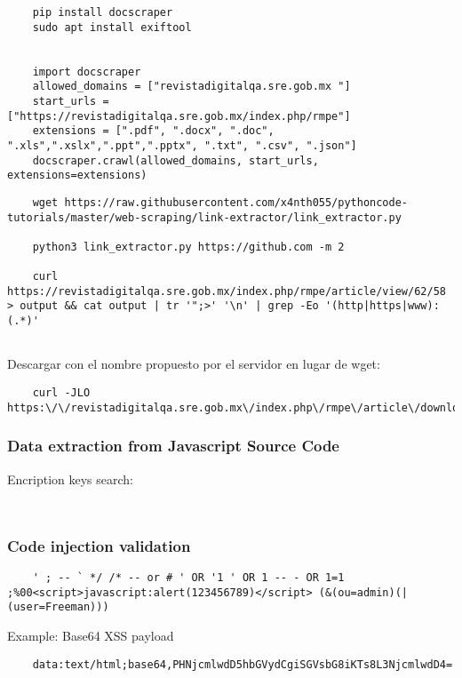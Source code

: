 \documentclass[letterpaper,12pt]{extarticle}
\begin{document}
\begin{verbatim}
	pip install docscraper 
	sudo apt install exiftool
	
	
	import docscraper 
	allowed_domains = ["revistadigitalqa.sre.gob.mx "]
	start_urls = ["https://revistadigitalqa.sre.gob.mx/index.php/rmpe"]
	extensions = [".pdf", ".docx", ".doc", ".xls",".xslx",".ppt",".pptx", ".txt", ".csv", ".json"]
	docscraper.crawl(allowed_domains, start_urls, extensions=extensions)
\end{verbatim}


\begin{verbatim}
	wget https://raw.githubusercontent.com/x4nth055/pythoncode-tutorials/master/web-scraping/link-extractor/link_extractor.py
	
	python3 link_extractor.py https://github.com -m 2
	
	curl https://revistadigitalqa.sre.gob.mx/index.php/rmpe/article/view/62/58 > output && cat output | tr '";>' '\n' | grep -Eo '(http|https|www):(.*)'
	
\end{verbatim}

Descargar con el nombre propuesto por el servidor en lugar de wget:
\begin{verbatim}
	curl -JLO https:\/\/revistadigitalqa.sre.gob.mx\/index.php\/rmpe\/article\/download\/62\/58\/100
\end{verbatim}


\subsubsection{Data extraction from Javascript Source Code}

Encription keys search:
\begin{verbatim}
	
\end{verbatim}

\subsubsection{Code injection validation}

\begin{verbatim}
	' ; -- ` */ /* -- or # ' OR '1 ' OR 1 -- - OR 1=1 ;%00<script>javascript:alert(123456789)</script> (&(ou=admin)(| (user=Freeman)))
\end{verbatim}

Example: Base64 XSS payload
\begin{verbatim}
	data:text/html;base64,PHNjcmlwdD5hbGVydCgiSGVsbG8iKTs8L3NjcmlwdD4=
\end{verbatim}
\end{document}
